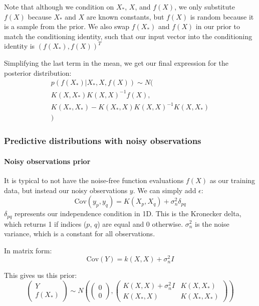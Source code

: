\documentclass[10pt]{article}
\begin{document}
Note that although we condition on $X_*$, $X$, and $f(X)$, we only substitute $f(X)$ because $X_*$ and $X$ are known constants, but $f(X)$ is random because it is a sample from the prior. We also swap $f(X_*)$ and $f(X)$ in our prior to match the conditioning identity, such that our input vector into the conditioning identity is $(f(X_*), f(X))^T$
    
Simplifying the last term in the mean, we get our final expression for the posterior distribution:
\begin{equation} \label{eq:conditioning}
    \begin{aligned}
        p(f(X_*)|X_*, X, f(X)) \sim N( \\
        K(X,X_*)K(X,X)^{-1}f(X), \\
        K(X_*,X_*) - K(X_*,X)K(X,X)^{-1}K(X,X_*) \\
        )
    \end{aligned}
\end{equation}


\subsubsection{Predictive distributions with noisy observations}
\paragraph{Noisy observations prior}
It is typical to not have the noise-free function evaluations $f(X)$ as our training data, but instead our noisy observations $y$. We can simply add $\epsilon$:
\begin{equation*}
    \text{Cov}(y_p, y_q) = K(X_p, X_q) + \sigma^2_n\delta_{pq}
\end{equation*}
$\delta_{pq}$ represents our independence condition in 1D. This is the Kronecker delta, which returns 1 if indices ($p$, $q$) are equal and 0 otherwise. $\sigma^2_n$ is the noise variance, which is a constant for all observations.
    
In matrix form:
\begin{equation*}
    \text{Cov}(Y) = k(X,X) + \sigma^2_nI
\end{equation*}
    
This gives us this prior:
\begin{equation*}
    \begin{pmatrix}
        Y \\ f(X_*)
    \end{pmatrix} \sim N\left(
    \begin{pmatrix}
        0 \\ 0
    \end{pmatrix},
    \begin{pmatrix}
        K(X,X) + \sigma^2_nI & K(X,X_*) \\ K(X_*,X) & K(X_*,X_*)
    \end{pmatrix}
    \right)
\end{equation*}
\end{document}

